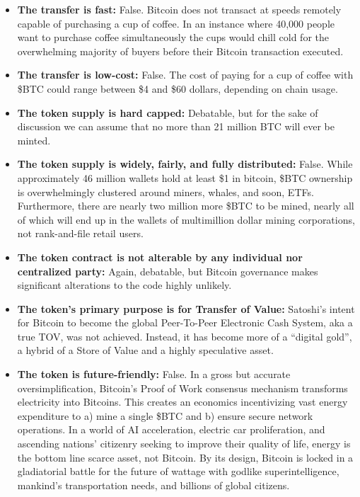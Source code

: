 \documentclass{article}
\begin{document}
\begin{itemize}
\item \textbf{The transfer is fast:} False. Bitcoin does not transact at speeds remotely capable of purchasing a cup of coffee. In an instance where 40,000 people want to purchase coffee simultaneously the cups would chill cold for the overwhelming majority of buyers before their Bitcoin transaction executed.
\item \textbf{The transfer is low-cost:} False. The cost of paying for a cup of coffee with \$BTC could range between \$4 and \$60 dollars, depending on chain usage.
\item \textbf{The token supply is hard capped:} Debatable, but for the sake of discussion we can assume that no more than 21 million BTC will ever be minted.
\item \textbf{The token supply is widely, fairly, and fully distributed:} False. While approximately 46 million wallets hold at least \$1 in bitcoin, \$BTC ownership is overwhelmingly clustered around miners, whales, and soon, ETFs. Furthermore, there are nearly two million more \$BTC to be mined, nearly all of which will end up in the wallets of multimillion dollar mining corporations, not rank-and-file retail users.
\item \textbf{The token contract is not alterable by any individual nor centralized party:} Again, debatable, but Bitcoin governance makes significant alterations to the code highly unlikely.
\item \textbf{The token's primary purpose is for Transfer of Value:} Satoshi's intent for Bitcoin to become the global Peer-To-Peer Electronic Cash System, aka a true TOV, was not achieved. Instead, it has become more of a ``digital gold'', a hybrid of a Store of Value and a highly speculative asset.
\item \textbf{The token is future-friendly:} False. In a gross but accurate oversimplification, Bitcoin's Proof of Work consensus mechanism transforms electricity into Bitcoins. This creates an economics incentivizing vast energy expenditure to a) mine a single \$BTC and b) ensure secure network operations. In a world of AI acceleration, electric car proliferation, and ascending nations' citizenry seeking to improve their quality of life, energy is the bottom line scarce asset, not Bitcoin. By its design, Bitcoin is locked in a gladiatorial battle for the future of wattage with godlike superintelligence, mankind's transportation needs, and billions of global citizens.
\end{itemize}
\end{document}

